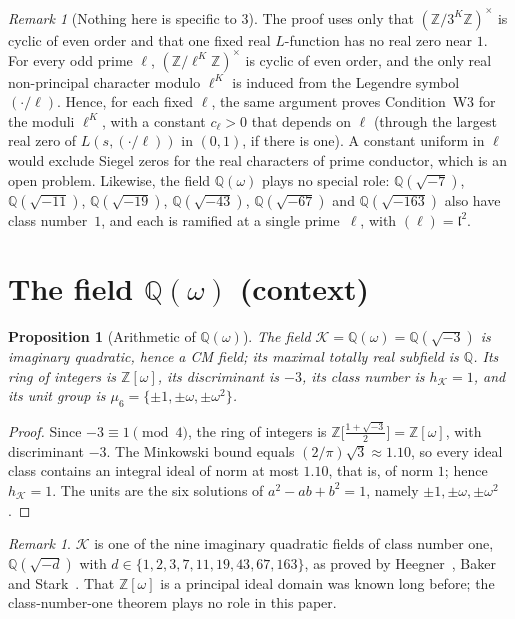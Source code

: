 \documentclass[12pt]{amsart}
\theoremstyle{plain}
\newtheorem{proposition}[theorem]{Proposition}
\theoremstyle{definition}
\theoremstyle{remark}
\newtheorem{remark}[theorem]{Remark}
\newcommand{\Z}{\mathbb{Z}}
\newcommand{\Q}{\mathbb{Q}}
\newcommand{\Zomega}{\Z[\omega]}
\newcommand{\Qomega}{\Q(\omega)}
\newcommand{\K}{\mathcal{K}}          %
\begin{document}
\begin{remark}[Nothing here is specific to $3$]
\label{rem:notspecific}
The proof uses only that $(\Z/3^K\Z)^\times$ is cyclic of even order and
that one fixed real $L$-function has no real zero near $1$. For every odd
prime $\ell$, $(\Z/\ell^K\Z)^\times$ is cyclic of even order, and the only
real non-principal character modulo $\ell^K$ is induced from the Legendre
symbol $(\cdot/\ell)$. Hence, for each fixed $\ell$, the same argument proves
Condition~W3 for the moduli $\ell^K$, with a constant $c_\ell > 0$ that
depends on $\ell$ (through the largest real zero of $L(s,(\cdot/\ell))$ in
$(0,1)$, if there is one). A constant uniform in $\ell$ would exclude Siegel
zeros for the real characters of prime conductor, which is an open problem.
Likewise, the field $\Qomega$ plays no special role: $\Q(\sqrt{-7})$,
$\Q(\sqrt{-11})$, $\Q(\sqrt{-19})$, $\Q(\sqrt{-43})$, $\Q(\sqrt{-67})$ and
$\Q(\sqrt{-163})$ also have class number~$1$, and each is ramified at a
single prime~$\ell$, with $(\ell) = \mathfrak l^2$.
\end{remark}

\section{The field $\Qomega$ (context)}
\label{sec:field}

\begin{proposition}[Arithmetic of $\Qomega$]
\label{prop:CM}
The field $\K = \Qomega = \Q(\sqrt{-3})$ is imaginary quadratic, hence a CM
field; its maximal totally real subfield is $\Q$. Its ring of integers is
$\Zomega$, its discriminant is $-3$, its class number is $h_\K = 1$, and its
unit group is $\mu_6 = \{\pm1, \pm\omega, \pm\omega^2\}$.
\end{proposition}

\begin{proof}
Since $-3 \equiv 1 \pmod 4$, the ring of integers is
$\Z\bigl[\tfrac{1+\sqrt{-3}}{2}\bigr] = \Zomega$, with discriminant $-3$.
The Minkowski bound equals $(2/\pi)\sqrt{3} \approx 1.10$, so every ideal
class contains an integral ideal of norm at most $1.10$, that is, of norm
$1$; hence $h_\K = 1$. The units are the six solutions of
$a^2 - ab + b^2 = 1$, namely $\pm1, \pm\omega, \pm\omega^2$.
\end{proof}

\begin{remark}
$\K$ is one of the nine imaginary quadratic fields of class number one,
$\Q(\sqrt{-d})$ with $d \in \{1,2,3,7,11,19,43,67,163\}$, as proved by
Heegner~\cite{Heegner1952}, Baker~\cite{Baker1966} and
Stark~\cite{Stark1967}. That $\Zomega$ is a principal ideal domain was known
long before; the class-number-one theorem plays no role in this paper.
\end{remark}
\end{document}
